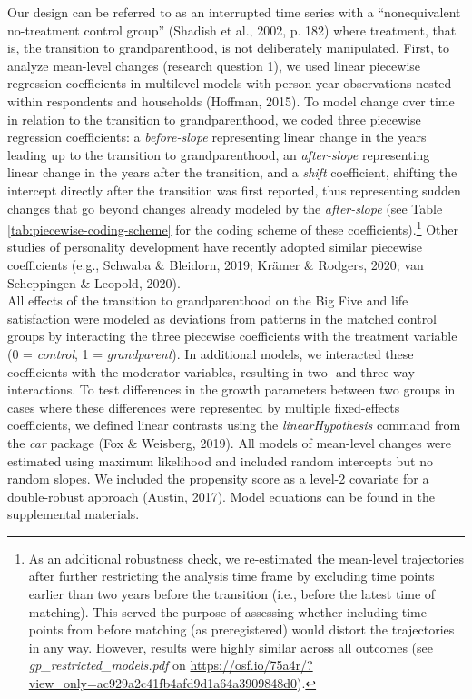 \documentclass[
  english,
  man, noextraspace,floatsintext]{apa7}
\begin{document}
Our design can be referred to as an interrupted time series with a \enquote{nonequivalent no-treatment control group} (Shadish et al., 2002, p. 182) where treatment, that is, the transition to grandparenthood, is not deliberately manipulated. First, to analyze mean-level changes (research question 1), we used linear piecewise regression coefficients in multilevel models with person-year observations nested within respondents and households (Hoffman, 2015). To model change over time in relation to the transition to grandparenthood, we coded three piecewise regression coefficients: a \emph{before-slope} representing linear change in the years leading up to the transition to grandparenthood, an \emph{after-slope} representing linear change in the years after the transition, and a \emph{shift} coefficient, shifting the intercept directly after the transition was first reported, thus representing sudden changes that go beyond changes already modeled by the \emph{after-slope} (see Table \ref{tab:piecewise-coding-scheme} for the coding scheme of these coefficients).\footnote{As an additional robustness check, we re-estimated the mean-level trajectories after further restricting the analysis time frame by excluding time points earlier than two years before the transition (i.e., before the latest time of matching). This served the purpose of assessing whether including time points from before matching (as preregistered) would distort the trajectories in any way. However, results were highly similar across all outcomes (see \emph{gp\_restricted\_models.pdf} on \url{https://osf.io/75a4r/?view_only=ac929a2c41fb4afd9d1a64a3909848d0}).} Other studies of personality development have recently adopted similar piecewise coefficients (e.g., Schwaba \& Bleidorn, 2019; Krämer \& Rodgers, 2020; van Scheppingen \& Leopold, 2020).\\
All effects of the transition to grandparenthood on the Big Five and life satisfaction were modeled as deviations from patterns in the matched control groups by interacting the three piecewise coefficients with the treatment variable (0 = \emph{control}, 1 = \emph{grandparent}). In additional models, we interacted these coefficients with the moderator variables, resulting in two- and three-way interactions. To test differences in the growth parameters between two groups in cases where these differences were represented by multiple fixed-effects coefficients, we defined linear contrasts using the \emph{linearHypothesis} command from the \emph{car} package (Fox \& Weisberg, 2019). All models of mean-level changes were estimated using maximum likelihood and included random intercepts but no random slopes. We included the propensity score as a level-2 covariate for a double-robust approach (Austin, 2017). Model equations can be found in the supplemental materials.\\
\end{document}

